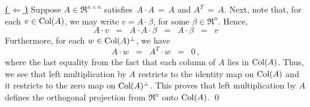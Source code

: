 \vskip 0.2cm
\noindent
\underline{\textbf{(\,$\Longleftarrow$\,)}}\quad
Suppose $A \in \Re^{n \times n}$ satisfies \,$A \cdot A \,=\, A$ and $A^{T} \,=\, A$.
Next, note that, for each $v \in \textnormal{Col}(A)$, we may write $v = A\cdot\beta$, for some $\beta\in\Re^{n}$.
Hence,
\begin{equation*}
A \cdot v
\;\;=\;\;
	A \cdot A \cdot \beta 
\;\;=\;\;
	A \cdot \beta 
\;\;=\;\;
	v
\end{equation*}
Furthermore, for each $w \in \textnormal{Col}(A)^{\perp}$, we have
\begin{equation*}
A \cdot w \;\;= \;\;A^{T} \cdot w \;\;=\;\; 0\,,
\end{equation*}
where the last equality from the fact that each column of $A$ lies in $\textnormal{Col}(A)$.
Thus, we see that left multiplication by $A$ restricts to the identity map on $\textnormal{Col}(A)$
and it restricts to the zero map on $\textnormal{Col}(A)^{\perp}$. This proves that left multiplication
by $A$ defines the orthogonal projection from $\Re^{n}$ onto $\textnormal{Col}(A)$.
\qed

